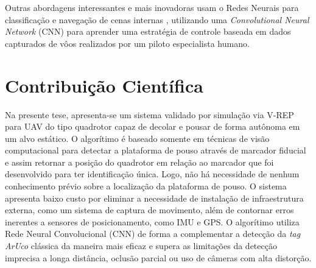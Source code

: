     Outras abordagens interessantes e mais inovadoras usam o Redes Neurais para classificação e navegação de cenas internas \citet{Kim2015}, utilizando uma \textit{Convolutional Neural Network} (CNN) para aprender uma estratégia de controle baseada em dados capturados de vôos realizados por um piloto especialista humano.
    
    


\section{Contribuição Científica}
    
    Na presente tese, apresenta-se um sistema validado por simulação via V-REP para UAV do tipo quadrotor capaz de decolar e pousar de forma autônoma em um alvo estático. O algorítimo é baseado somente em técnicas de visão computacional para detectar a plataforma de pouso através de marcador fiducial e assim retornar a posição do quadrotor em relação ao marcador que foi desenvolvido para ter identificação única. Logo, não há necessidade de nenhum conhecimento prévio sobre a localização da plataforma de pouso. O sistema apresenta baixo custo por eliminar a necessidade de instalação de infraestrutura externa, como um sistema de captura de movimento, além de contornar erros inerentes a sensores de posicionamento, como IMU e GPS. O algorítimo utiliza Rede Neural Convolucional (CNN) de forma a complementar a detecção da \textit{tag} \textit{ArUco} clássica da maneira mais eficaz e supera as limitações da detecção imprecisa a longa distância, oclusão parcial ou uso de câmeras com alta distorção.




